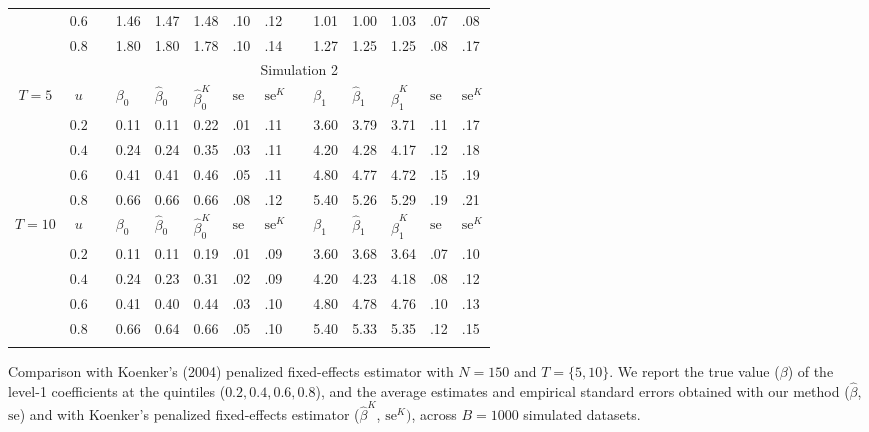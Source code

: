 \documentclass[12pt]{article}
\begin{document}
\begin{table}
\begin{tabular}{cc
m{0.01cm}m{0.5cm}m{0.5cm}m{0.5cm}m{0.3cm}m{0.3cm}
m{0.01cm}m{0.5cm}m{0.5cm}m{0.5cm}m{0.3cm}m{0.3cm}
}
& $0.6$ && 1.46 & 1.47 & 1.48 & .10 & .12 && 1.01 & 1.00 & 1.03 & .07 & .08 \\
& $0.8$ && 1.80 & 1.80 & 1.78 & .10 & .14 && 1.27 & 1.25 & 1.25 & .08 & .17 \\
\noalign{\vspace{0.2cm}}
\hline
\hline
\noalign{\vspace{0.2cm}}
 &&& \multicolumn{11}{c}{Simulation 2}\\
\noalign{\vspace{0.1cm}}
\hline
\noalign{\vspace{0.2cm}}
$T = 5$ & $u$ && 
	$\beta_0$ & $\hat\beta_0$ & $\hat\beta_0^K$ & $\text{se}$ & $\text{se}^K$ &&
	$\beta_1$ & $\hat\beta_1$ & $\hat\beta_1^K$ & $\text{se}$ & $\text{se}^K$\\
\cline{4-8}\cline{10-14}
\noalign{\vspace{0.1cm}}
& $0.2$ && 0.11 & 0.11 & 0.22 & .01 & .11 && 3.60 & 3.79 & 3.71 & .11 & .17 \\
& $0.4$ && 0.24 & 0.24 & 0.35 & .03 & .11 && 4.20 & 4.28 & 4.17 & .12 & .18 \\
& $0.6$ && 0.41 & 0.41 & 0.46 & .05 & .11 && 4.80 & 4.77 & 4.72 & .15 & .19 \\
& $0.8$ && 0.66 & 0.66 & 0.66 & .08 & .12 && 5.40 & 5.26 & 5.29 & .19 & .21 \\
\noalign{\vspace{0.2cm}}
$T = 10$ & $u$ && 
	$\beta_0$ & $\hat\beta_0$ & $\hat\beta_0^K$ & $\text{se}$ & $\text{se}^K$ &&
	$\beta_1$ & $\hat\beta_1$ & $\hat\beta_1^K$ & $\text{se}$ & $\text{se}^K$\\
\cline{4-8}\cline{10-14}
\noalign{\vspace{0.1cm}}
& $0.2$ && 0.11 & 0.11 & 0.19 & .01 & .09 && 3.60 & 3.68 & 3.64 & .07 & .10 \\
& $0.4$ && 0.24 & 0.23 & 0.31 & .02 & .09 && 4.20 & 4.23 & 4.18 & .08 & .12 \\
& $0.6$ && 0.41 & 0.40 & 0.44 & .03 & .10 && 4.80 & 4.78 & 4.76 & .10 & .13 \\
& $0.8$ && 0.66 & 0.64 & 0.66 & .05 & .10 && 5.40 & 5.33 & 5.35 & .12 & .15 \\
\noalign{\vspace{0.1cm}}
\hline
\hline
\noalign{\vspace{0.1cm}}
\end{tabular}
\vspace{0.1cm}\footnotesize\center
Comparison with Koenker's (2004) penalized fixed-effects estimator with $N = 150$ and $T = \{5, 10\}$.
We report the true value ($\beta$) of the level-1 coefficients at the quintiles ($0.2, 0.4, 0.6, 0.8$),
and the average estimates and empirical standard errors obtained with our method ($\hat \beta$, $\text{se}$) and 
with Koenker's penalized fixed-effects estimator ($\hat \beta^K$, $\text{se}^K)$, across $B = 1000$ simulated datasets. 
\end{table}
\end{document}
